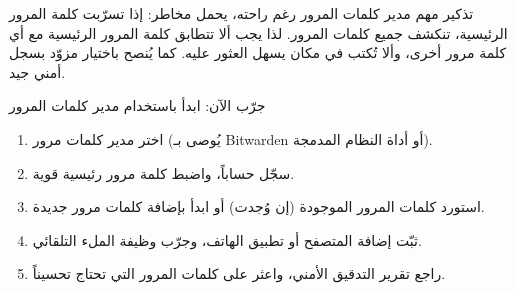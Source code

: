 \begin{tcbwarn}{تذكير مهم}
مدير كلمات المرور رغم راحته، يحمل مخاطر: إذا تسرّبت كلمة المرور الرئيسية، تنكشف جميع كلمات المرور. لذا يجب ألا تتطابق كلمة المرور الرئيسية مع أي كلمة مرور أخرى، وألا تُكتب في مكان يسهل العثور عليه. كما يُنصح باختيار مزوّد بسجل أمني جيد.

\end{tcbwarn}

\begin{tcbpractice}{جرّب الآن: ابدأ باستخدام مدير كلمات المرور}
\begin{enumerate}
  \item اختر مدير كلمات مرور (يُوصى بـ Bitwarden أو أداة النظام المدمجة).
  \item سجّل حساباً، واضبط كلمة مرور رئيسية قوية.
  \item استورد كلمات المرور الموجودة (إن وُجدت) أو ابدأ بإضافة كلمات مرور جديدة.
  \item ثبّت إضافة المتصفح أو تطبيق الهاتف، وجرّب وظيفة الملء التلقائي.
  \item راجع تقرير التدقيق الأمني، واعثر على كلمات المرور التي تحتاج تحسيناً.
\end{enumerate}

\end{tcbpractice}
